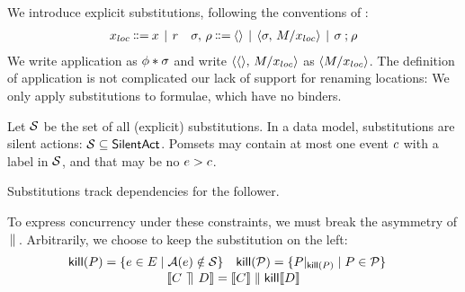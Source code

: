 We introduce explicit substitutions,
following the conventions of \citet{DBLP:conf/icalp/RitterP97}: 
\begin{align*}
  \aLocReg\!\!\BNFDEF\!\! \aLoc \!\BNFSEP\! \aReg
  &&
  \aSub,\,\bSub\!\!\BNFDEF\!\! \SUBEMP \!\BNFSEP\! \SUBPAR{\aSub}{\aExp/\aLocReg}
  \!\BNFSEP\! \aSub\SUBSEQ\bSub
\end{align*}
We write application as $\phi\mathbin{\ast}\sigma$ and write
$\langle\langle\rangle,\,M/x_{{loc}}\rangle$ as $\langle M/x_{{loc}}\rangle$.  The definition
of application is not complicated our lack of support for renaming locations:
We only apply substitutions to formulae, which have no binders.


Let $\mathcal{S}$ be the set of all (explicit) substitutions.  In a data model,
substitutions are silent actions: $\mathcal{S}\subseteq\mathsf{SilentAct}$.  Pomsets may contain
at most one event $c$ with a label in $\mathcal{S}$, and that may be no
$e>c$.

Substitutions track dependencies for the follower.

To express concurrency under these constraints, we must break the asymmetry
of \!$\,\mathbin{\|}\,$\!.  Arbitrarily, we choose to keep the substitution on the left:
\begin{gather*}
  \begin{aligned}
    \mathsf{kill}(P)&=\{ e\in E \mid \mathcal{A}(e)\notin\mathcal{S} \}
    &
    \mathsf{kill}(\mathcal{P})&=\{P\mathbin{|}_{\mathsf{kill}(P)} \mid P\in\mathcal{P} \}
  \end{aligned}
  \\[-.5ex]
  \llbracket C \,\mathbin{\rrceil}\, D\rrbracket
  = \llbracket C\rrbracket \parallel \mathsf{kill}\llbracket D\rrbracket
\end{gather*}



